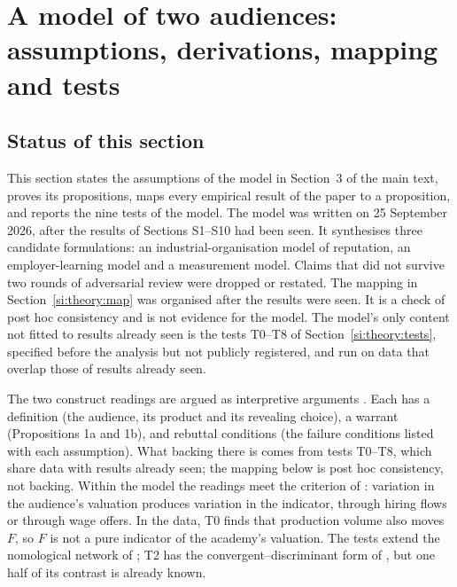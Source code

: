 \documentclass[11pt]{article}
\begin{document}
\clearpage
\section{A model of two audiences: assumptions, derivations, mapping and tests}\label{si:theory}

\subsection*{Status of this section}

This section states the assumptions of the model in Section~3 of the main text, proves its propositions, maps
every empirical result of the paper to a proposition, and reports the nine tests of the model. The model was
written on 25 September 2026, after the results of Sections S1--S10 had been seen. It synthesises three candidate formulations: an
industrial-organisation model of reputation, an employer-learning model and a measurement model. Claims that did
not survive two rounds of adversarial review were dropped or restated. The mapping in
Section~\ref{si:theory:map} was organised after the results were seen. It is a check of post hoc consistency and is
not evidence for the model. The model's only content not fitted to results already seen is the tests T0--T8 of
Section~\ref{si:theory:tests}, specified before the analysis but not publicly registered, and run on data that
overlap those of results already seen.

The two construct readings are argued as interpretive arguments \citep{kane2013validating}. Each has a
definition (the audience, its product and its revealing choice), a warrant (Propositions 1a and 1b), and
rebuttal conditions (the failure conditions listed with each assumption). What backing there is comes from
tests T0--T8, which share data with results already seen; the mapping below is post hoc consistency, not backing.
Within the model the readings meet the criterion of \citet{borsboom2004concept}: variation in the audience's
valuation produces variation in the indicator, through hiring flows or through wage offers. In the data, T0 finds
that production volume also moves $F$, so $F$ is not a pure indicator of the academy's valuation. The tests extend the nomological network of
\citet{cronbach1955construct}; T2 has the convergent--discriminant form of \citet{campbell1959convergent}, but one
half of its contrast is already known.
\end{document}
